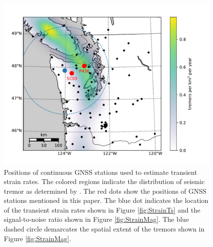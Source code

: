\documentclass[extra,mreferee]{gji}
\begin{document}
\begin{figure}
\includegraphics{figures/context_map/context-map.pdf}
\caption{Positions of continuous GNSS stations used to estimate transient strain rates. The colored regions indicate the distribution of seismic tremor as determined by \citet{Wech2010}. The red dots show the positions of GNSS stations mentioned in this paper. The blue dot indicates the location of the transient strain rates shown in Figure \ref{fig:StrainTs} and the signal-to-noise ratio shown in Figure \ref{fig:StrainMag}. The blue dashed circle demarcates the spatial extent of the tremors shown in Figure \ref{fig:StrainMag}.}    
\label{fig:Context}
\end{figure}
\end{document}

